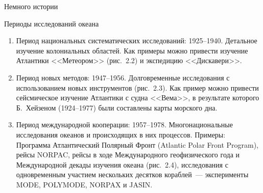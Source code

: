 \begin{chapter}{Немного истории}
\begin{section}{Периоды исследований океана}
\begin{enumerate}
\item
Период национальных систематических исследований: 1925--1940.
Детальное изучение колониальных областей. Как
примеры можно привести изучение Атлантики <<Метеором>> (рис.~2.2) и
экспедицию <<Дискавери>>.
%


\item
Период новых методов: 1947--1956. Долговременные
исследования с использованием новых инструментов (рис.~2.3). Как
пример можно привести сейсмическое изучение Атлантики с судна <<Вема>>, в
результате которого Б.~Хейзеном (1924--1977) были составлены карты морского дна.
%


\item
Период международной кооперации: 1957--1978.
Многонациональные исследования океанов и происходящих в них процессов.
Примеры: Программа Атлантический Полярный Фронт
(Atlantic Polar Front Program), рейсы NORPAC, рейсы в ходе
Международного геофизического года и Международной декады изучения
океана (рис.~2.4), исследования с одновременным участием нескольких
десятков кораблей~--- эксперименты MODE, POLYMODE, NORPAX и JASIN.
%



\end{enumerate}
\end{section}
\end{chapter}
